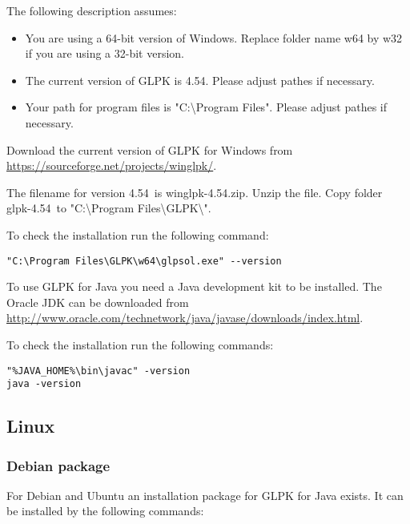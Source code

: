 \documentclass[a4paper,11pt]{report}
\newcommand{\glpkVersionMajor}{4}
\newcommand{\glpkVersionMinor}{54}
\begin{document}
The following description assumes:

\begin{itemize}
\item You are using a 64-bit version of Windows. Replace folder name w64 by w32 if you are using a 32-bit version.
\item The current version of GLPK is \glpkVersionMajor.\glpkVersionMinor. Please adjust pathes if necessary.
\item Your path for program files is "C:\textbackslash Program Files". Please adjust pathes if necessary.
\end{itemize}

Download the current version of GLPK for Windows from \href{https://sourceforge.net/projects/winglpk/}{https://sourceforge.net/projects/winglpk/}.

The filename for version \glpkVersionMajor.\glpkVersionMinor\ is winglpk-\glpkVersionMajor.\glpkVersionMinor.zip. Unzip the file. Copy folder glpk-\glpkVersionMajor.\glpkVersionMinor\ to "C:\textbackslash Program Files\textbackslash GLPK\textbackslash ".

To check the installation run the following command:

\begin{lstlisting}
"C:\Program Files\GLPK\w64\glpsol.exe" --version
\end{lstlisting}

To use GLPK for Java you need a Java development kit to be installed. The Oracle JDK can be downloaded from \href{http://www.oracle.com/technetwork/java/javase/downloads/index.html}{http://www.oracle.com/technetwork/java/javase/downloads/index.html}.

To check the installation run the following commands:

\begin{lstlisting}
"%JAVA_HOME%\bin\javac" -version
java -version
\end{lstlisting}

\subsection{Linux}
\subsubsection{Debian package}

For Debian and Ubuntu an installation package for GLPK for Java exists. It can be installed by the following commands:
\end{document}
